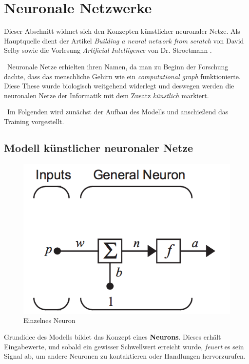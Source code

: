 \newpage
\section{Neuronale Netzwerke}
\label{sec:NN}
Dieser Abschnitt widmet sich den Konzepten künstlicher neuronaler Netze. Als Hauptquelle dient der Artikel \textit{Building a neural network from scratch} von David Selby \cite{SelbyNN} sowie die Vorlesung \textit{Artificial Intelligence} von Dr. Stroetmann \cite{stroetmann}.

~\newline Neuronale Netze erhielten ihren Namen, da man zu Beginn der Forschung dachte, dass das menschliche Gehirn wie ein \textit{computational graph} funktionierte. Diese These wurde biologisch weitgehend widerlegt und deswegen werden die neuronalen Netze der Informatik mit dem Zusatz \textit{künstlich} markiert. 

~\newline Im Folgenden wird zunächst der Aufbau des Modells und anschießend das Training vorgestellt.
\subsection{Modell künstlicher neuronaler Netze}
\begin{figure}[h]
	\begin{center}
		\includegraphics[width=0.4\linewidth]{Bilder/singleNeuron}
		\caption[Einzelnes Neuron: \newline \tiny \url{
			http://caisplusplus.usc.edu/blog/curriculum/lesson4}\normalsize]{Einzelnes Neuron}
		\label{fig:Neuron}
	\end{center}
\end{figure}

Grundidee des Modells bildet das Konzept eines \textbf{Neurons}. Dieses erhält Eingabewerte, und sobald ein gewisser Schwellwert erreicht wurde, \textit{feuert} es sein Signal ab, um andere Neuronen zu kontaktieren oder Handlungen hervorzurufen. 

